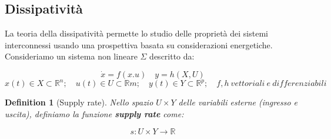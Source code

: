 \documentclass{book}
\newtheorem{definition}{Definition}[section]
\begin{document}
 \subsection{Dissipatività}
 La teoria della dissipatività permette lo studio delle proprietà dei sistemi interconnessi usando una prospettiva basata su considerazioni energetiche.\newline
 Consideriamo un sistema non lineare \(\Sigma\) descritto da:
 \begin{center}
 \begin{equation*}
          \dot{x}=f(x.u)\quad y=h(X,U)
 \end{equation*}
 \begin{equation*}
     x(t)\in X\subset\mathbb{R}^n;\quad u(t)\in U\subset\mathbb{R}m;\quad y(t)\in Y\subset \mathbb{R}^p;\quad f,h\  vettoriali\ e\ differenziabili
 \end{equation*}
 \end{center}
 \begin{definition}[Supply rate]
  Nello spazio \(U\times Y\) delle variabili esterne (ingresso e uscita), definiamo la funzione \textbf{supply rate} come:
  \begin{center}
      \begin{equation*}
          s:U\times Y\rightarrow \mathbb{R}
      \end{equation*}
      
  \end{center}
 \end{definition}
 
\end{document}
